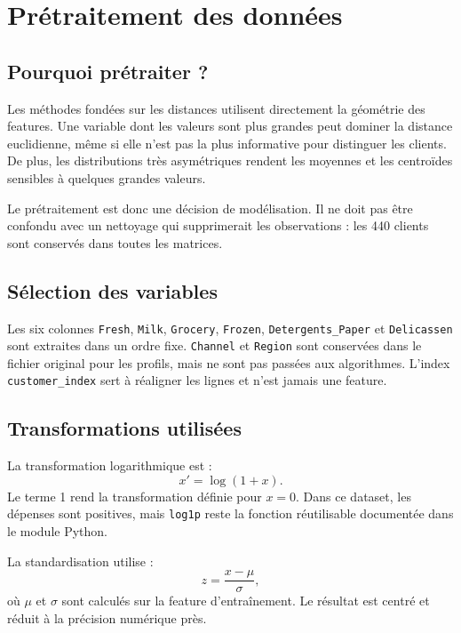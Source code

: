\chapter{Prétraitement des données}

\section{Pourquoi prétraiter ?}
Les méthodes fondées sur les distances utilisent directement la géométrie des features. Une variable dont les valeurs sont plus grandes peut dominer la distance euclidienne, même si elle n'est pas la plus informative pour distinguer les clients. De plus, les distributions très asymétriques rendent les moyennes et les centroïdes sensibles à quelques grandes valeurs.

Le prétraitement est donc une décision de modélisation. Il ne doit pas être confondu avec un nettoyage qui supprimerait les observations : les 440 clients sont conservés dans toutes les matrices.

\section{Sélection des variables}
Les six colonnes \texttt{Fresh}, \texttt{Milk}, \texttt{Grocery}, \texttt{Frozen}, \texttt{Detergents\_Paper} et \texttt{Delicassen} sont extraites dans un ordre fixe. \texttt{Channel} et \texttt{Region} sont conservées dans le fichier original pour les profils, mais ne sont pas passées aux algorithmes. L'index \texttt{customer\_index} sert à réaligner les lignes et n'est jamais une feature.

\section{Transformations utilisées}
La transformation logarithmique est :
\begin{equation}
x' = \log(1+x).
\end{equation}
Le terme 1 rend la transformation définie pour $x=0$. Dans ce dataset, les dépenses sont positives, mais \texttt{log1p} reste la fonction réutilisable documentée dans le module Python.

La standardisation utilise :
\begin{equation}
z=\frac{x-\mu}{\sigma},
\end{equation}
où $\mu$ et $\sigma$ sont calculés sur la feature d'entraînement. Le résultat est centré et réduit à la précision numérique près.

